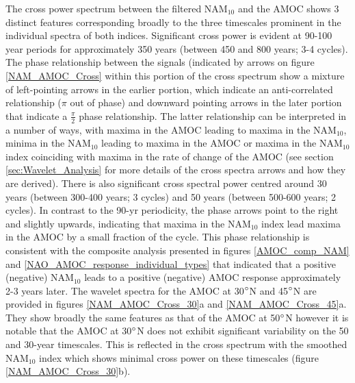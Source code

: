 The cross power spectrum between the filtered NAM$_{10}$ and the AMOC shows 3 distinct features corresponding broadly to the three timescales prominent in the individual spectra of both indices. Significant cross power is evident at 90-100 year periods for approximately 350 years (between 450 and 800 years; 3-4 cycles). The phase relationship between the signals (indicated by arrows on figure \ref{NAM_AMOC_Cross} within this portion of the cross spectrum  show a mixture of left-pointing arrows in the earlier portion, which indicate an anti-correlated relationship  ($\pi$ out of phase) and downward pointing arrows in the later portion that indicate a $\frac{\pi}{2}$ phase relationship. The latter relationship can be interpreted in a number of ways, with maxima in the AMOC leading to maxima in the NAM$_{10}$, minima in the NAM$_{10}$ leading to maxima in the AMOC or maxima in the NAM$_{10}$ index coinciding with maxima in the rate of change of the AMOC (see section \ref{sec:Wavelet_Analysis} for more details of the cross spectra arrows and how they are derived). There is also significant cross spectral power centred around 30 years (between 300-400 years; 3 cycles) and 50 years (between 500-600 years; 2 cycles). In contrast to the 90-yr periodicity, the phase arrows point to the right and slightly upwards, indicating that maxima in the NAM$_{10}$ index lead maxima in the AMOC by a small fraction of the cycle. This phase relationship is consistent with the composite analysis presented in figures \ref{AMOC_comp_NAM} and \ref{NAO_AMOC_response_individual_types} that indicated that a positive (negative) NAM$_{10}$ leads to a positive (negative) AMOC response approximately 2-3 years later. The wavelet spectra for the AMOC at 30$\degree$N and 45$\degree$N are provided in figures \ref{NAM_AMOC_Cross_30}a and \ref{NAM_AMOC_Cross_45}a. They show broadly the same features as that of the AMOC at 50$\degree$N however it is notable that the AMOC at 30$\degree$N does not exhibit significant variability on the 50 and 30-year timescales. This is reflected in the cross spectrum with the smoothed NAM$_{10}$ index which shows minimal cross power on these timescales (figure \ref{NAM_AMOC_Cross_30}b). 

